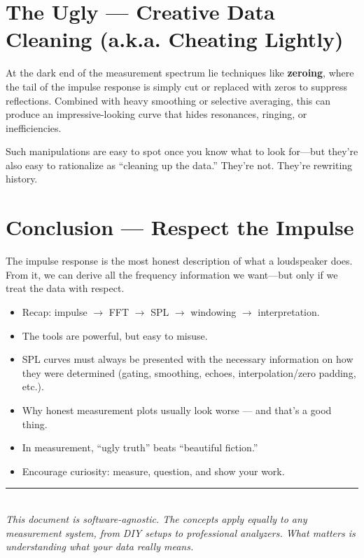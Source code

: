 \documentclass[12pt,a4paper]{article}
\begin{document}
\section{The Ugly --- Creative Data Cleaning (a.k.a. Cheating Lightly)}

At the dark end of the measurement spectrum lie techniques like \textbf{zeroing}, where the tail of the impulse response is simply cut or replaced with zeros to suppress reflections. Combined with heavy smoothing or selective averaging, this can produce an impressive-looking curve that hides resonances, ringing, or inefficiencies.  

Such manipulations are easy to spot once you know what to look for—but they’re also easy to rationalize as “cleaning up the data.” They’re not. They’re rewriting history.

\section{Conclusion --- Respect the Impulse}

The impulse response is the most honest description of what a loudspeaker does. From it, we can derive all the frequency information we want—but only if we treat the data with respect.

\begin{itemize}[noitemsep]
    \item Recap: impulse $\rightarrow$ FFT $\rightarrow$ SPL $\rightarrow$ windowing $\rightarrow$ interpretation.
    \item The tools are powerful, but easy to misuse.
    \item SPL curves must always be presented with the necessary information on how they were determined (gating, smoothing, echoes, interpolation/zero padding, etc.).
    \item Why honest measurement plots usually look worse --- and that’s a good thing.
    \item In measurement, ``ugly truth'' beats ``beautiful fiction.''
    \item Encourage curiosity: measure, question, and show your work.
\end{itemize}

\vspace{1em}
\noindent\rule{\textwidth}{0.4pt}\\
\textit{This document is software-agnostic. The concepts apply equally to any measurement system, from DIY setups to professional analyzers. What matters is understanding what your data really means.}
\end{document}
